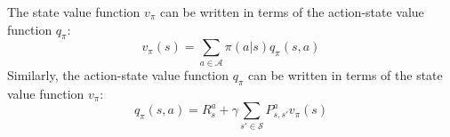 \documentclass{article}
\begin{document}
The state value function $ v_{\pi} $ can be written in terms of the action-state value function $ q_{\pi} $:
\[ v_{\pi}(s) = \sum_{a \in \mathcal{A}} \pi(a | s)q_{\pi}(s,a) \]
Similarly, the action-state value function $ q_{\pi} $ can be written in terms of the state value function $ v_{\pi} $:
\[ q_{\pi}(s,a) = R_s^a + \gamma \sum_{s' \in \mathcal{S}} P_{s,s'}^a v_{\pi}(s) \]

\end{document}
